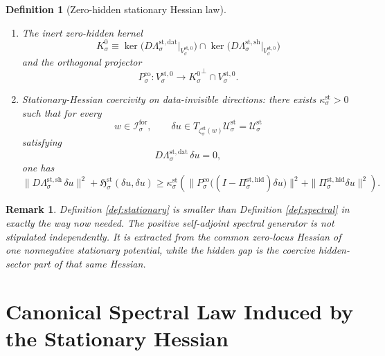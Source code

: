 \documentclass[11pt]{article}
\newcommand{\ForSpace}[1]{\mathcal I_{#1}^{\mathrm{for}}}
\newcommand{\Kernel}[1]{K_{#1}^{0}}
\newcommand{\StateComp}[1]{P_{#1}^{\mathrm{co}}}
\newcommand{\StatSpace}[1]{\mathcal U_{#1}^{\mathrm{st}}}
\newcommand{\StatData}[1]{\Lambda_{#1}^{\mathrm{st,dat}}}
\newcommand{\StatShell}[1]{\Lambda_{#1}^{\mathrm{st,sh}}}
\newcommand{\StatZero}[1]{V_{#1}^{\mathrm{st},0}}
\newcommand{\StatProj}[1]{\Pi_{#1}^{\mathrm{st,hid}}}
\newcommand{\StatHess}[1]{\mathfrak H_{#1}^{\mathrm{st}}}
\newcommand{\StatEmbed}[1]{\zeta_{#1}^{\mathrm{st}}}
\newtheorem{definition}{Definition}
\newtheorem{remark}{Remark}
\begin{document}
\begin{definition}[Zero-hidden stationary Hessian law]
\begin{enumerate}
\begin{equation}
    \label{eq:statsolvability}
    \end{equation}
    \item The inert zero-hidden kernel
    \[
    \Kernel{\sigma}
    \equiv
    \ker\bigl(D\StatData{\sigma}\big|_{\StatZero{\sigma}}\bigr)
    \cap
    \ker\bigl(D\StatShell{\sigma}\big|_{\StatZero{\sigma}}\bigr)
    \]
    and the orthogonal projector
    \[
    \StateComp{\sigma}:
    \StatZero{\sigma}\to
    {\Kernel{\sigma}}^{\perp}\cap\StatZero{\sigma}.
    \]
    \item Stationary-Hessian coercivity on data-invisible directions: there exists \(\kappa_{\sigma}^{\mathrm{st}}>0\) such that for every
    \[
    w\in\ForSpace{\sigma},
    \qquad
    \delta u\in T_{\StatEmbed{\sigma}(w)}\StatSpace{\sigma}=\StatSpace{\sigma}
    \]
    satisfying
    \[
    D\StatData{\sigma}\,\delta u=0,
    \]
    one has
    \begin{equation}
    \|D\StatShell{\sigma}\,\delta u\|^{2}
    +
    \StatHess{\sigma}(\delta u,\delta u)
    \ge
    \kappa_{\sigma}^{\mathrm{st}}
    \left(
    \|\StateComp{\sigma}\bigl((I-\StatProj{\sigma})\delta u\bigr)\|^{2}
    +
    \|\StatProj{\sigma}\delta u\|^{2}
    \right).
    \label{eq:statcoercive}
    \end{equation}
\end{enumerate}
\end{definition}

\begin{remark}
Definition \ref{def:stationary} is smaller than Definition \ref{def:spectral} in exactly the way now needed. The positive self-adjoint spectral generator is not stipulated independently. It is extracted from the common zero-locus Hessian of one nonnegative stationary potential, while the hidden gap is the coercive hidden-sector part of that same Hessian.
\end{remark}

\section{Canonical Spectral Law Induced by the Stationary Hessian}
\end{document}
